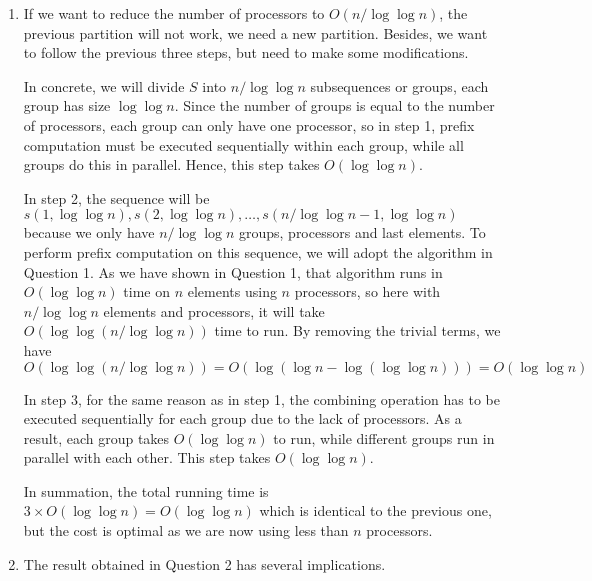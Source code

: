 \documentclass[11pt]{article}
\begin{document}
\begin{enumerate}
    \item If we want to reduce the number of processors to $O(n/\log \log n)$, the previous partition will not work, we need a new partition. Besides, we want to follow the previous three steps, but need to make some modifications.

    In concrete, we will divide $S$ into $n/\log \log n$ subsequences or groups, each group has size $\log \log n$. Since the number of groups is equal to the number of processors, each group can only have one processor, so in step 1, prefix computation must be executed sequentially within each group, while all groups do this in parallel. Hence, this step takes $O(\log \log n)$.

    In step 2, the sequence will be $s(1,\log \log n), s(2,\log \log n), \dots, s(n/\log \log n-1,\log \log n)$ because we only have $n/\log \log n$ groups, processors and last elements. To perform prefix computation on this sequence, we will adopt the algorithm in Question 1. As we have shown in Question 1, that algorithm runs in $O(\log \log n)$ time on $n$ elements using $n$ processors, so here with $n/\log \log n$ elements and processors, it will take $O(\log \log(n/\log \log n))$ time to run. By removing the trivial terms, we have
    \begin{equation*}
      O(\log \log(n/\log \log n)) = O(\log(\log n-\log(\log \log n))) = O(\log \log n)
    \end{equation*}

    In step 3, for the same reason as in step 1, the combining operation has to be executed sequentially for each group due to the lack of processors. As a result, each group takes $O(\log \log n)$ to run, while different groups run in parallel with each other. This step takes $O(\log \log n)$.

    In summation, the total running time is $3 \times O(\log \log n) = O(\log \log n)$ which is identical to the previous one, but the cost is optimal as we are now using less than $n$ processors.

    \item The result obtained in Question 2 has several implications.


\end{enumerate}
\end{document}
